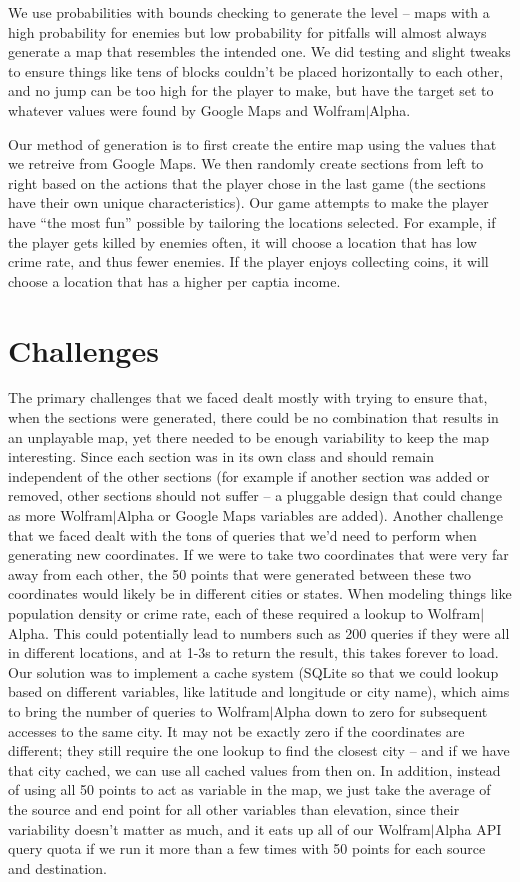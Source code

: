 \documentclass[12pt]{article}
\begin{document}
We use probabilities with bounds checking to generate the level -- maps with a high probability for enemies but low probability for pitfalls will almost always generate a map that resembles the intended one.  We did testing and slight tweaks to ensure things like tens of blocks couldn't be placed horizontally to each other, and no jump can be too high for the player to make, but have the target set to whatever values were found by Google Maps and Wolfram$\vert$Alpha.

Our method of generation is to first create the entire map using the values that we retreive from Google Maps.  We then randomly create sections from left to right based on the actions that the player chose in the last game (the sections have their own unique characteristics).  Our game attempts to make the player have ``the most fun'' possible by tailoring the locations selected. For example, if the player gets killed by enemies often, it will choose a location that has low crime rate, and thus fewer enemies.  If the player enjoys collecting coins, it will choose a location that has a higher per captia income.

\section{Challenges}
The primary challenges that we faced dealt mostly with trying to ensure that, when the sections were generated, there could be no combination that results in an unplayable map, yet there needed to be enough variability to keep the map interesting.  Since each section was in its own class and should remain independent of the other sections (for example if another section was added or removed, other sections should not suffer -- a pluggable design that could change as more Wolfram$\vert$Alpha or Google Maps variables are added).  Another challenge that we faced dealt with the tons of queries that we'd need to perform when generating new coordinates.  If we were to take two coordinates that were very far away from each other, the 50 points that were generated between these two coordinates would likely be in different cities or states.  When modeling things like population density or crime rate, each of these required a lookup to Wolfram$\vert$Alpha.  This could potentially lead to numbers such as 200 queries if they were all in different locations, and at 1-3s to return the result, this takes forever to load.   Our solution was to implement a cache system (SQLite so that we could lookup based on different variables, like latitude and longitude or city name), which aims to bring the number of queries to Wolfram$\vert$Alpha down to zero for subsequent accesses to the same city.  It may not be exactly zero if the coordinates are different; they still require the one lookup to find the closest city -- and if we have that city cached, we can use all cached values from then on.  In addition, instead of using all 50 points to act as variable in the map, we just take the average of the source and end point for all other variables than elevation, since their variability doesn't matter as much, and it eats up all of our Wolfram$\vert$Alpha API query quota if we run it more than a few times with 50 points for each source and destination.
\end{document}
